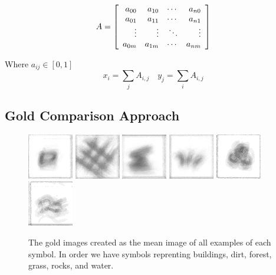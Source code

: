 \documentclass[preprint,3p,12pt]{elsarticle}
\begin{document}
\begin{equation}
A =
\left [
    \begin{array}{r r r r}
        a_{00} & a_{10} & \cdots & a_{n0} \\
        a_{01} & a_{11} & \cdots & a_{n1}\\
        \vdots  & \vdots  & \ddots & \vdots\\
        a_{0m} & a_{1m} & \cdots & a_{nm}\\
    \end{array}
\right ]
\end{equation}

Where $a_{ij} \in [0,1]$
\[
x_{i} = \sum_{j}{A_{i,j}} \quad
y_{j} = \sum_{i}{A_{i,j}}
\]

\subsection{Gold Comparison Approach}

\lipsum[1]

\begin{figure}[h]
\includegraphics{building-mean}
\includegraphics{dirt-mean}
\includegraphics{forest-mean}
\includegraphics{grass-mean}
\includegraphics{rocks-mean}
\includegraphics{water-mean}

\caption{The gold images created as the mean image of all examples of each symbol. In order we have symbols reprenting buildings, dirt, forest, grass, rocks, and water.}

\end{figure}
\end{document}
